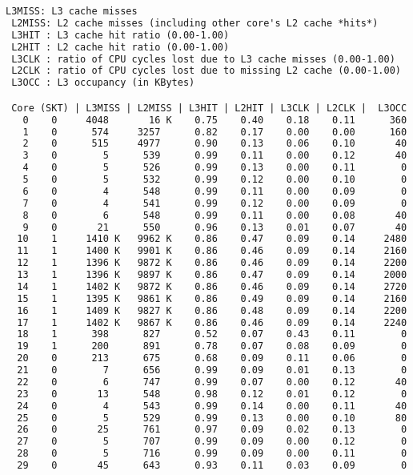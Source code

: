 \begin{lstlisting}[language=TeX]
 L3MISS: L3 cache misses 
 L2MISS: L2 cache misses (including other core's L2 cache *hits*) 
 L3HIT : L3 cache hit ratio (0.00-1.00)
 L2HIT : L2 cache hit ratio (0.00-1.00)
 L3CLK : ratio of CPU cycles lost due to L3 cache misses (0.00-1.00)
 L2CLK : ratio of CPU cycles lost due to missing L2 cache (0.00-1.00)
 L3OCC : L3 occupancy (in KBytes)

 Core (SKT) | L3MISS | L2MISS | L3HIT | L2HIT | L3CLK | L2CLK |  L3OCC
   0    0     4048       16 K    0.75    0.40    0.18    0.11      360
   1    0      574     3257      0.82    0.17    0.00    0.00      160
   2    0      515     4977      0.90    0.13    0.06    0.10       40
   3    0        5      539      0.99    0.11    0.00    0.12       40
   4    0        5      526      0.99    0.13    0.00    0.11        0
   5    0        5      532      0.99    0.12    0.00    0.10        0
   6    0        4      548      0.99    0.11    0.00    0.09        0
   7    0        4      541      0.99    0.12    0.00    0.09        0
   8    0        6      548      0.99    0.11    0.00    0.08       40
   9    0       21      550      0.96    0.13    0.01    0.07       40
  10    1     1410 K   9962 K    0.86    0.47    0.09    0.14     2480
  11    1     1400 K   9901 K    0.86    0.46    0.09    0.14     2160
  12    1     1396 K   9872 K    0.86    0.46    0.09    0.14     2200
  13    1     1396 K   9897 K    0.86    0.47    0.09    0.14     2000
  14    1     1402 K   9872 K    0.86    0.46    0.09    0.14     2720
  15    1     1395 K   9861 K    0.86    0.49    0.09    0.14     2160
  16    1     1409 K   9827 K    0.86    0.48    0.09    0.14     2200
  17    1     1402 K   9867 K    0.86    0.46    0.09    0.14     2240
  18    1      398      827      0.52    0.07    0.43    0.11        0
  19    1      200      891      0.78    0.07    0.08    0.09        0
  20    0      213      675      0.68    0.09    0.11    0.06        0
  21    0        7      656      0.99    0.09    0.01    0.13        0
  22    0        6      747      0.99    0.07    0.00    0.12       40
  23    0       13      548      0.98    0.12    0.01    0.12        0
  24    0        4      543      0.99    0.14    0.00    0.11       40
  25    0        5      529      0.99    0.13    0.00    0.10       80
  26    0       25      761      0.97    0.09    0.02    0.13        0
  27    0        5      707      0.99    0.09    0.00    0.12        0
  28    0        5      716      0.99    0.09    0.00    0.11        0
  29    0       45      643      0.93    0.11    0.03    0.09        0

\end{lstlisting}
